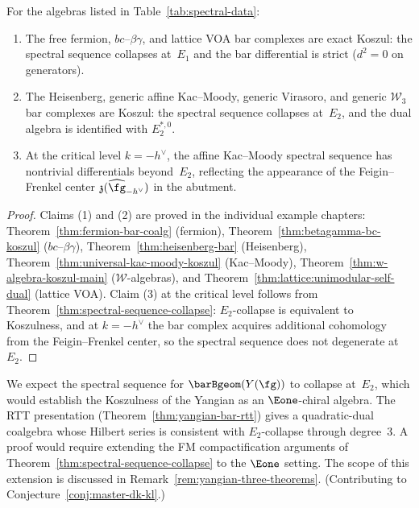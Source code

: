 \begin{proposition}
\label{prop:spectral-collapse-summary}
For the algebras listed in Table~\textup{\ref{tab:spectral-data}}:
\begin{enumerate}
\item The free fermion, $bc$--$\beta\gamma$, and lattice VOA
  bar complexes are exact Koszul: the spectral sequence collapses
  at~$E_1$ and the bar differential is strict ($d^2 = 0$ on generators).
\item The Heisenberg, generic affine Kac--Moody, generic Virasoro,
  and generic $\mathcal{W}_3$ bar complexes are Koszul: the spectral
  sequence collapses at~$E_2$, and the dual algebra is identified
  with $E_2^{*,0}$.
\item At the critical level $k = -h^\vee$, the affine Kac--Moody
  spectral sequence has nontrivial differentials beyond~$E_2$,
  reflecting the appearance of the Feigin--Frenkel center
  $\mathfrak{z}(\widehat{\fg}_{-h^\vee})$ in the abutment.
\end{enumerate}
\end{proposition}

\begin{proof}
Claims (1) and (2) are proved in the individual example chapters:
Theorem~\ref{thm:fermion-bar-coalg} (fermion),
Theorem~\ref{thm:betagamma-bc-koszul} ($bc$--$\beta\gamma$),
Theorem~\ref{thm:heisenberg-bar} (Heisenberg),
Theorem~\ref{thm:universal-kac-moody-koszul} (Kac--Moody),
Theorem~\ref{thm:w-algebra-koszul-main} ($\mathcal{W}$-algebras),
and Theorem~\ref{thm:lattice:unimodular-self-dual} (lattice VOA).
Claim (3) at the critical level follows from
Theorem~\ref{thm:spectral-sequence-collapse}:
$E_2$-collapse is equivalent to Koszulness, and at $k = -h^\vee$
the bar complex acquires additional cohomology from the
Feigin--Frenkel center, so the spectral sequence does not degenerate
at~$E_2$.
\end{proof}

\begin{remark}\label{rem:yangian-collapse-conj}
\ClaimStatusConjectured
{}
We expect the spectral sequence for $\barBgeom(Y(\fg))$ to collapse
at~$E_2$, which would establish the Koszulness of the Yangian as
an $\Eone$-chiral algebra.
The RTT presentation (Theorem~\ref{thm:yangian-bar-rtt}) gives a
quadratic-dual coalgebra whose Hilbert series is consistent with
$E_2$-collapse through degree~$3$.
A proof would require extending the FM compactification arguments
of Theorem~\ref{thm:spectral-sequence-collapse} to the $\Eone$
setting.
The scope of this extension is discussed in
Remark~\ref{rem:yangian-three-theorems}.
(Contributing to Conjecture~\ref{conj:master-dk-kl}.)
\end{remark}

